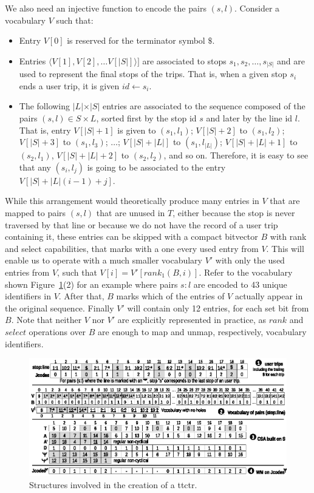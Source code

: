     We also need an injective function to encode the pairs $(s,l)$. Consider a vocabulary $V$ such that:
    \begin{itemize}
    	\item Entry $V[0]$ is reserved for the terminator symbol $\$$.
    	\item Entries $\langle V[1],V[2], \dots V[|S|]\rangle]$ are associated to stops $s_1,s_2,\dots, s_{|S|}$ and are used to represent the final stops of the trips. That is, when a given stop $s_i$ ends a user trip, it is given $id \leftarrow s_i$.
    	\item The following $|L|$$\times$$|S|$ entries are associated to the sequence composed of the pairs $(s,l) \in S\times L$, sorted first by the stop id $s$ and later by the line id $l$. That is, entry $V[|S|+1]$ is given to $(s_1,l_1)$; $V[|S|+2]$ to $(s_1,l_2)$; $V[|S|+3]$ to $(s_1,l_3)$; $\dots$; $V[|S|+|L|]$ to $(s_1,l_{|L|})$;  $V[|S|+|L|+1]$ to $(s_2, l_1)$, $V[|S|+|L|+2]$ to $(s_2, l_2)$, and so on. Therefore, it is easy to see that any $(s_i,l_j)$ is going to be associated to the entry $V[|S|+ |L|(i-1) + j]$.
    \end{itemize}
    
    While this arrangement would theoretically produce many entries in $V$ that are mapped to pairs $(s,l)$ that are unused in $T$, either because the stop is never traversed by that line or because we do not have the record of a user trip containing it, these entries can be skipped with a compact bitvector $B$ with rank and select capabilities, that marks with a one every used entry from $V$. This will enable us to operate with a much smaller vocabulary $V'$ with only the used entries from $V$, such that $V[i] = V'[rank_1(B,i)]$. Refer to the vocabulary shown Figure~\ref{fig:ttctr}(2) for an example where pairs $s:l$ are encoded to 43 unique identifiers in $V$. After that, $B$ marks which of the entries of $V$ actually appear in the original sequence. Finally $V'$ will contain only 12 entries, for each set bit from $B$. Note that neither $V$ nor $V'$ are explicitly represented in practice, as $rank$ and $select$ operations over $B$ are enough to map and unmap, respectively, vocabulary identifiers.

    \begin{figure}[ht]
        \includegraphics[width=1.00\textwidth]{figures/ttctr2019.eps}
    	\caption{Structures involved in the creation of a \acrshort{ttctr}.}
    	\label{fig:ttctr}
    \end{figure}
    
